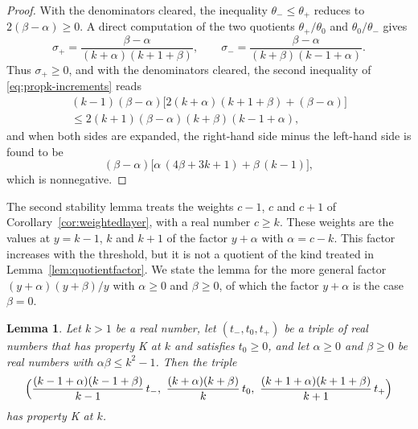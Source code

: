 \documentclass{amsart}
\newtheorem{lemma}[theorem]{Lemma}
\theoremstyle{definition}
\theoremstyle{remark}
\numberwithin{equation}{section}
\begin{document}
\begin{proof}
With the denominators cleared, the inequality $\theta_-\le\theta_+$ reduces
to $2(\beta-\alpha)\ge0$. A direct computation of the two quotients
$\theta_+/\theta_0$ and $\theta_0/\theta_-$ gives
\[
\sigma_+=\frac{\beta-\alpha}{(k+\alpha)(k+1+\beta)},\qquad
\sigma_-=\frac{\beta-\alpha}{(k+\beta)(k-1+\alpha)} .
\]
Thus $\sigma_+\ge0$, and with the denominators cleared, the second
inequality of \eqref{eq:propk-increments} reads
\begin{multline*}
(k-1)(\beta-\alpha)\bigl[2(k+\alpha)(k+1+\beta)+(\beta-\alpha)\bigr]\\
\le2(k+1)(\beta-\alpha)(k+\beta)(k-1+\alpha),
\end{multline*}
and when both sides are expanded, the right-hand side minus the left-hand
side is found to be
\[
(\beta-\alpha)\bigl[\alpha\,(4\beta+3k+1)+\beta\,(k-1)\bigr],
\]
which is nonnegative.
\end{proof}

The second stability lemma treats the weights $c-1$, $c$ and $c+1$ of
Corollary~\ref{cor:weightedlayer}, with a real number
$c\ge k$. These weights are the values at $y=k-1$, $k$ and $k+1$ of the
factor $y+\alpha$ with $\alpha=c-k$. This factor increases with the
threshold, but it is not a quotient of the kind treated in
Lemma~\ref{lem:quotientfactor}. We state the lemma for the more general
factor $(y+\alpha)(y+\beta)/y$ with $\alpha\ge0$ and $\beta\ge0$, of which
the factor $y+\alpha$ is the case $\beta=0$.

\begin{lemma}\label{lem:productfactor}
Let $k>1$ be a real number, let $(t_-,t_0,t_+)$ be a triple of real numbers
that has property K at $k$ and satisfies $t_0\ge0$, and let $\alpha\ge0$
and $\beta\ge0$ be real numbers with $\alpha\beta\le k^2-1$. Then the
triple
\[
\Bigl(\frac{(k-1+\alpha)(k-1+\beta)}{k-1}\,t_-,
\ \frac{(k+\alpha)(k+\beta)}{k}\,t_0,
\ \frac{(k+1+\alpha)(k+1+\beta)}{k+1}\,t_+\Bigr)
\]
has property K at $k$.
\end{lemma}
\end{document}
